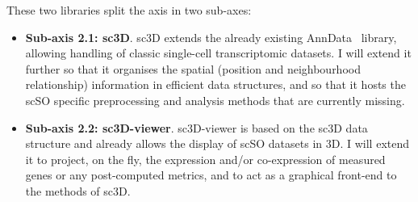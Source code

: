 These two libraries split the axis in two sub-axes:
\begin{itemize}
   \item \textbf{Sub-axis 2.1: sc3D}.
   sc3D extends the already existing AnnData~\cite{Wolf2018} library, allowing handling of classic single-cell transcriptomic datasets.
   I will extend it further so that it organises the spatial (position and neighbourhood relationship) information in efficient data structures, and so that it hosts the scSO specific preprocessing and analysis methods that are currently missing.
   \item \textbf{Sub-axis 2.2: sc3D-viewer}.
   sc3D-viewer is based on the sc3D data structure and already allows the display of scSO datasets in 3D.
   I will extend it to project, on the fly, the expression and/or co-expression of measured genes or any post-computed metrics, and to act as a graphical front-end to the methods of sc3D.
\end{itemize}
